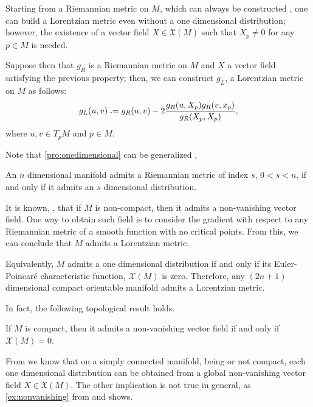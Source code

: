 Starting from a Riemannian metric on $M$, which can always be constructed \cite{romero10}, one can build a Lorentzian metric even without a one dimensional distribution; however, the existence of a vector field $X \in \mathfrak{X}(M)$ such that $X_p \neq 0$ for any $p \in M$ is needed.

Suppose then that $g_R$ is a Riemannian metric on $M$ and $X$ a vector field satisfying the previous property; then, we can construct $g_L$, a Lorentzian metric on $M$ as follows:
\[
g_L(u,v) \defeq g_R(u,v) - 2  \frac{g_R(u, X_p)g_R(v,x_p)}{g_R(X_p,X_p)},
\]
where $u,v \in T_pM$ and $p \in M$.

Note that \autoref{pro:onedimensional} can be generalized \cite[Prop. 4.3]{romero10}, \cite{greub72}

\begin{proposition}
	An $n$ dimensional manifold admits a Riemannian metric of index $s$, $0 < s < n$, if and only if it admits an $s$ dimensional distribution.
\end{proposition}

It is known, \cite[p. 205]{romero10}, that if $M$ is non-compact, then it admits a non-vanishing vector field. One way to obtain such field is to consider the gradient with respect to any Riemannian metric of a smooth function with no critical points. From this, we can conclude that $M$ admits a Lorentzian metric.

Equivalently, $M$ admits a one dimensional distribution if and only if its Euler-Poincaré characteristic function, $\mathcal{X}(M)$ is zero. Therefore, any $(2n + 1)$ dimensional compact orientable manifold admits a Lorentzian metric.

In fact, the following topological result holds.
\begin{proposition}
	If $M$ is compact, then it admits a non-vanishing vector field if and only if $\mathcal{X}(M)=0$.
\end{proposition}

From \cite{romero10} we know that on a simply connected manifold, being or not compact, each one dimensional distribution can be obtained from a global non-vanishing vector field $X \in \mathfrak{X}(M)$. The other implication is not true in general, as \autoref{ex:nonvanishing} from \cite[pp. 205-206]{romero10} and \cite{greub72} shows.

